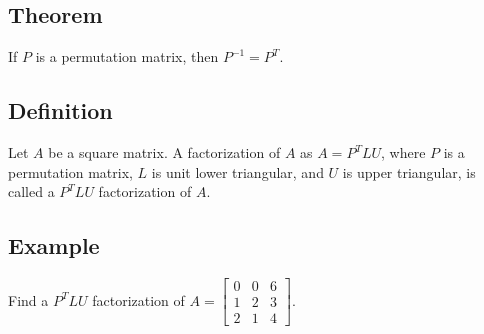 \subsection*{Theorem}
If $P$ is a permutation matrix, then $P^{-1}=P^T$.

\subsection*{Definition}
Let $A$ be a square matrix. A factorization of $A$ as $A=P^TLU$, where $P$ is a
permutation matrix, $L$ is unit lower triangular, and $U$ is upper triangular,
is called a $P^TLU$ factorization of $A$.

\subsection*{Example}
Find a $P^TLU$ factorization of $A=\begin{bmatrix}
        0 & 0 & 6 \\
        1 & 2 & 3 \\
        2 & 1 & 4
    \end{bmatrix}$.

